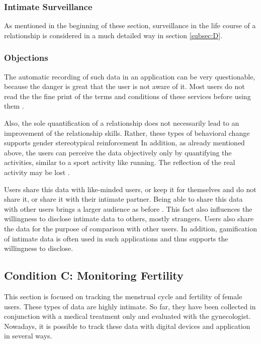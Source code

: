 \subsubsection{Intimate Surveillance}
As mentioned in the beginning of these section, surveillance in the life course of a relationship is considered in a much detailed way in section \ref{subsec:D}.

\subsubsection{Objections}
The automatic recording of such data in an application can be very questionable, because the danger is great that the user is not aware of it. Most users do not read the the fine print of the terms and conditions of these services before using them \cite{anaya2018ethical}.

Also, the sole quantification of a relationship does not necessarily lead to an improvement of the relationship skills. Rather, these types of behavioral change supports gender stereotypical reinforcement 
In addition, as already mentioned above, the users can perceive the data objectively only by quantifying the activities, similar to a sport activity like running. The reflection of the real activity may be lost \cite{doi:10.1080/13691058.2014.920528}.

Users share this data with like-minded users, or keep it for themselves and do not share it, or share it with their intimate partner.
Being able to share this data with other users brings a larger audience as before \cite{doi:10.1080/13691058.2014.920528}. This fact also influences the willingness to disclose intimate data to others, mostly strangers.
Users also share the data for the purpose of comparison with other users. In addition, gamification of intimate data is often used in such applications and thus supports the willingness to disclose.

\subsection{Condition C: Monitoring Fertility}
\label{subsec:c}
This section is focused on tracking the menstrual cycle and fertility of female users. These types of data are highly intimate. So far, they have been collected in conjunction with a medical treatment only and evaluated with the 
gynecologist. Nowadays, it is possible to track these data with digital devices and application in several ways.
